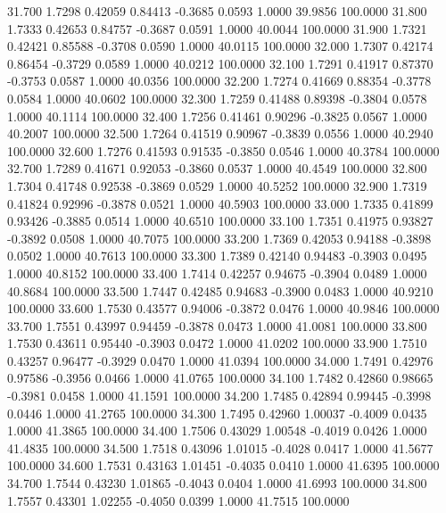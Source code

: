   31.700   1.7298   0.42059   0.84413  -0.3685   0.0593   1.0000  39.9856 100.0000
  31.800   1.7333   0.42653   0.84757  -0.3687   0.0591   1.0000  40.0044 100.0000
  31.900   1.7321   0.42421   0.85588  -0.3708   0.0590   1.0000  40.0115 100.0000
  32.000   1.7307   0.42174   0.86454  -0.3729   0.0589   1.0000  40.0212 100.0000
  32.100   1.7291   0.41917   0.87370  -0.3753   0.0587   1.0000  40.0356 100.0000
  32.200   1.7274   0.41669   0.88354  -0.3778   0.0584   1.0000  40.0602 100.0000
  32.300   1.7259   0.41488   0.89398  -0.3804   0.0578   1.0000  40.1114 100.0000
  32.400   1.7256   0.41461   0.90296  -0.3825   0.0567   1.0000  40.2007 100.0000
  32.500   1.7264   0.41519   0.90967  -0.3839   0.0556   1.0000  40.2940 100.0000
  32.600   1.7276   0.41593   0.91535  -0.3850   0.0546   1.0000  40.3784 100.0000
  32.700   1.7289   0.41671   0.92053  -0.3860   0.0537   1.0000  40.4549 100.0000
  32.800   1.7304   0.41748   0.92538  -0.3869   0.0529   1.0000  40.5252 100.0000
  32.900   1.7319   0.41824   0.92996  -0.3878   0.0521   1.0000  40.5903 100.0000
  33.000   1.7335   0.41899   0.93426  -0.3885   0.0514   1.0000  40.6510 100.0000
  33.100   1.7351   0.41975   0.93827  -0.3892   0.0508   1.0000  40.7075 100.0000
  33.200   1.7369   0.42053   0.94188  -0.3898   0.0502   1.0000  40.7613 100.0000
  33.300   1.7389   0.42140   0.94483  -0.3903   0.0495   1.0000  40.8152 100.0000
  33.400   1.7414   0.42257   0.94675  -0.3904   0.0489   1.0000  40.8684 100.0000
  33.500   1.7447   0.42485   0.94683  -0.3900   0.0483   1.0000  40.9210 100.0000
  33.600   1.7530   0.43577   0.94006  -0.3872   0.0476   1.0000  40.9846 100.0000
  33.700   1.7551   0.43997   0.94459  -0.3878   0.0473   1.0000  41.0081 100.0000
  33.800   1.7530   0.43611   0.95440  -0.3903   0.0472   1.0000  41.0202 100.0000
  33.900   1.7510   0.43257   0.96477  -0.3929   0.0470   1.0000  41.0394 100.0000
  34.000   1.7491   0.42976   0.97586  -0.3956   0.0466   1.0000  41.0765 100.0000
  34.100   1.7482   0.42860   0.98665  -0.3981   0.0458   1.0000  41.1591 100.0000
  34.200   1.7485   0.42894   0.99445  -0.3998   0.0446   1.0000  41.2765 100.0000
  34.300   1.7495   0.42960   1.00037  -0.4009   0.0435   1.0000  41.3865 100.0000
  34.400   1.7506   0.43029   1.00548  -0.4019   0.0426   1.0000  41.4835 100.0000
  34.500   1.7518   0.43096   1.01015  -0.4028   0.0417   1.0000  41.5677 100.0000
  34.600   1.7531   0.43163   1.01451  -0.4035   0.0410   1.0000  41.6395 100.0000
  34.700   1.7544   0.43230   1.01865  -0.4043   0.0404   1.0000  41.6993 100.0000
  34.800   1.7557   0.43301   1.02255  -0.4050   0.0399   1.0000  41.7515 100.0000
